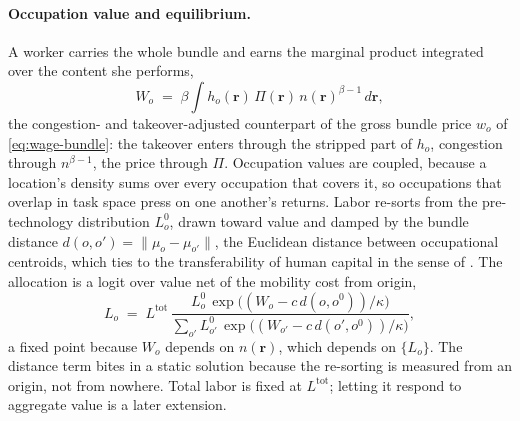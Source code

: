 \documentclass[12pt, a4paper]{article}
\begin{document}
\paragraph{Occupation value and equilibrium.}
A worker carries the whole bundle and earns the marginal product
integrated over the content she performs,
\begin{equation}
  W_o
  \;=\;
  \beta \int h_o(\mathbf{r})\,\Pi(\mathbf{r})\,
  n(\mathbf{r})^{\beta-1}\, d\mathbf{r},
  \label{eq:occ-value}
\end{equation}
the congestion- and takeover-adjusted counterpart of the gross
bundle price $w_o$ of \eqref{eq:wage-bundle}: the takeover enters
through the stripped part of $h_o$, congestion through $n^{\beta-1}$,
the price through $\Pi$. Occupation values are
coupled, because a location's density sums over every occupation that
covers it, so occupations that overlap in task space press on one
another's returns. Labor re-sorts from the pre-technology distribution
$L_o^{0}$, drawn toward value and damped by the bundle distance
$d(o,o') = \|\mu_o - \mu_{o'}\|$, the Euclidean distance between
occupational centroids, which \textcite{storck2026geometry} ties to
the transferability of human capital in the sense of
\textcite{gathmann2010}. The allocation is a logit
over value net of the mobility cost from origin,
\begin{equation}
  L_o
  \;=\;
  L^{\text{tot}}\,
  \frac{L_o^{0}\,\exp\!\bigl((W_o - c\, d(o,o^{0}))/\kappa\bigr)}
       {\sum_{o'} L_{o'}^{0}\,\exp\!\bigl((W_{o'} - c\, d(o',o^{0}))/\kappa\bigr)},
  \label{eq:equilibrium}
\end{equation}
a fixed point because $W_o$ depends on $n(\mathbf{r})$, which depends on
$\{L_o\}$. The distance term bites in a static solution because the
re-sorting is measured from an origin, not from nowhere. Total labor is
fixed at $L^{\text{tot}}$; letting it respond to aggregate value is a
later extension.
\end{document}

